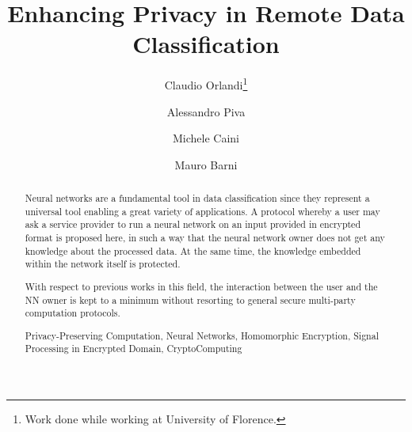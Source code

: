 \documentclass[11pt,oribibl,runningheads]{llncs}
\newcommand{\keywords}[1]{\par\addvspace\baselineskip
\noindent\keywordname\enspace\ignorespaces#1}
\begin{document}
\mainmatter  %

\title{Enhancing Privacy in Remote Data Classification}


%
%
\author{Claudio Orlandi\thanks{Work done while working at University of Florence.}\and Alessandro Piva \and Michele Caini \and Mauro
Barni}
%


%
%

\maketitle


\begin{abstract}

Neural networks are a fundamental tool in data
classification since they represent a universal tool enabling a
great variety of applications. A protocol whereby a user may ask
a service provider to run a neural network on an input provided in
encrypted format is proposed here, in such a way that the neural
network owner does not get any knowledge about the processed data. At the same
time, the knowledge embedded within the network itself is
protected.

With respect to
previous works in this field, the interaction between the user and
the NN owner is kept to a minimum without resorting to general secure multi-party
computation protocols.

\keywords{Privacy-Preserving Computation, Neural Networks,
Homomorphic Encryption, Signal Processing in Encrypted Domain,
CryptoComputing}
\end{abstract}
\end{document}
